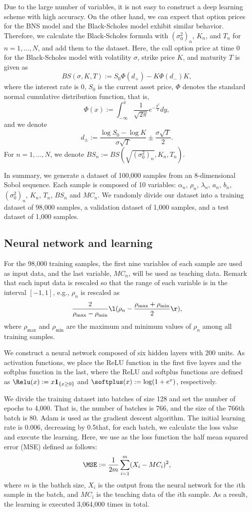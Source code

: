 Due to the large number of variables, it is not easy to construct a deep learning scheme with high accuracy.
On the other hand, we can expect that option prices for the BNS model and the Black-Scholes model exhibit similar behavior.
Therefore, we calculate the Black-Scholes formula with $(\sigma^2_0)_n$, $K_n$, and $T_n$ for $n=1,\dots,N$, and add them to the dataset.
Here, the call option price at time 0 for the Black-Scholes model with volatility $\sigma$, strike price $K$, and maturity $T$ is given as
\[
BS(\sigma,K,T) := S_0\Phi(d_+)-K\Phi(d_-)K,
\]
where the interest rate is 0, $S_0$ is the current asset price, $\Phi$ denotes the standard normal cumulative distribution function, that is,
\[
\Phi(x) := \int_{-\infty}^x\frac{1}{\sqrt{2 \pi}}e^{-\frac{y^2}{2}}dy,
\]
and we denote
\[
d_{\pm} := \frac{\log S_0-\log K}{\sigma \sqrt{T}}\pm\frac{\sigma\sqrt{T}}{2}.
\]
For $n=1,\dots,N$, we denote $BS_n := BS(\sqrt{(\sigma^2_0)_n},K_n,T_n)$.

In summary, we generate a dataset of 100,000 samples from an 8-dimensional Sobol sequence.
Each sample is composed of 10 variables: $\alpha_n$, $\rho_n$, $\lambda_n$, $a_n$, $b_n$, $(\sigma_0^2)_n$, $K_n$, $T_n$, $BS_n$ and $MC_n$.
We randomly divide our dataset into a training dataset of 98,000 samples, a validation dataset of 1,000 samples, and a test dataset of 1,000 samples.

\subsection{Neural network and learning}
For the 98,000 training samples, the first nine variables of each sample are used as input data, and the last variable, $MC_n$, will be used as teaching data.
Remark that each input data is rescaled so that the range of each variable is in the interval $[-1,1]$, e.g., $\rho_n$ is rescaled as
\[
\frac{2}{\rho_{\max}-\rho_{\min}}\l(\rho_n-\frac{\rho_{\max}+\rho_{\min}}{2}\r),
\]
where $\rho_{\max}$ and $\rho_{\min}$ are the maximum and minimum values of $\rho_n$ among all training samples.

We construct a neural network composed of six hidden layers with 200 units.
As activation functions, we place the ReLU function in the first five layers and the softplus function in the last,
where the ReLU and softplus functions are defined as $\Relu(x) := x{\bf 1}_{\{x\geq0\}}$ and $\softplus(x) := \log(1+e^x)$, respectively.

We divide the training dataset into batches of size 128 and set the number of epochs to 4,000.
That is, the number of batches is 766, and the size of the 766th batch is 80.
Adam is used as the gradient descent algorithm. The initial learning rate is 0.006, decreasing by 0.5\Note that, for each batch, we calculate the loss value and execute the learning.
Here, we use as the loss function the half mean squared error (MSE) defined as follows:
\begin{align*}
\MSE := \frac{1}{2m}\sum^m_{i=1}(X_i-MC_i)^2,
\end{align*}
where $m$ is the bathch size, $X_i$ is the output from the neural network for the $i$th sample in the batch,
and $MC_i$ is the teaching data of the $i$th sample.
As a result, the learning is executed 3,064,000 times in total.


